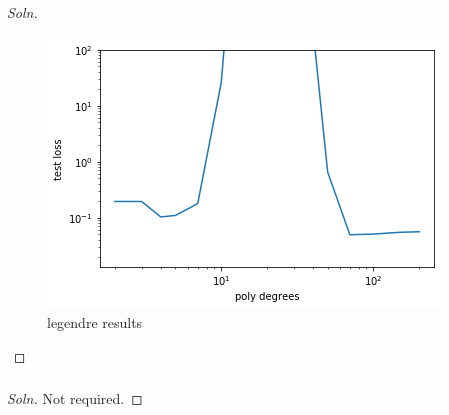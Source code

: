 \documentclass{article}
\begin{document}
\begin{proof}[Soln]
\begin{figure}[H]
			\includegraphics[width=0.45\linewidth]{legendre_loss.png}
			\caption{legendre results}
		\end{figure}
	\end{proof}
	\subsubsection{}
	\begin{proof}[Soln]
		Not required.
	\end{proof}
\end{document}
